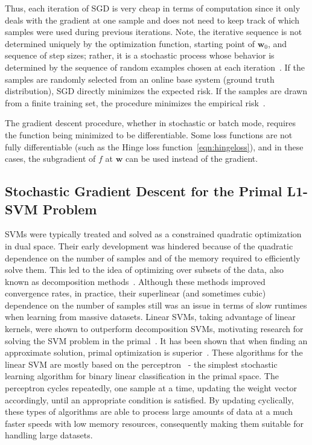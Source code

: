 \documentclass[reqno]{vcuthesis}
\numberwithin{equation}{chapter}
\begin{document}
Thus, each iteration of SGD is very cheap in terms of computation since it only deals with the gradient at one sample and does not need to keep track of which samples were used during previous iterations. Note, the iterative sequence is not determined uniquely by the optimization function, starting point of $\bm w_0$, and sequence of step sizes; rather, it is a stochastic process whose behavior is determined by the sequence of random examples chosen at each iteration~\cite{bottou2010large,bottou2018optimization}. If the samples are randomly selected from an online base system (ground truth distribution), SGD directly minimizes the expected risk. If the samples are drawn from a finite training set, the procedure minimizes the empirical risk~\cite{bottou2002stochastic}.

The gradient descent procedure, whether in stochastic or batch mode, requires the function being minimized to be differentiable. Some loss functions are not fully differentiable (such as the Hinge loss function~\ref{eqn:hingeloss}), and in these cases, the subgradient of $f$ at $\bm{w}$ can be used instead of the gradient. 

\subsection{Stochastic Gradient Descent for the Primal L1-SVM Problem}
SVMs were typically treated and solved as a constrained quadratic optimization in dual space. Their early development was hindered because of the quadratic dependence on the number of samples and of the memory required to efficiently solve them. This led to the idea of optimizing over subsets of the data, also known as decomposition methods~\cite{boser1992training,Joachims1999,keerthi2001improvements,Platt1998}. Although these methods improved convergence rates, in practice, their superlinear (and sometimes cubic) dependence on the number of samples still was an issue in terms of slow runtimes when learning from massive datasets. Linear SVMs, taking advantage of linear kernels, were shown to outperform decomposition SVMs, motivating research for solving the SVM problem in the primal~\cite{Chapelle2007,panagiotakopoulos2013stochastic}. It has been shown that when finding an approximate solution, primal optimization is superior~\cite{Chapelle2007}. These algorithms for the linear SVM are mostly based on the perceptron~\cite{freund1999large,rosenblatt1958perceptron} - the simplest stochastic learning algorithm for binary linear classification in the primal space. The perceptron cycles repeatedly, one sample at a time, updating the weight vector accordingly, until an appropriate condition is satisfied. By updating cyclically, these types of algorithms are able to process large amounts of data at a much faster speeds with low memory resources, consequently making them suitable for handling large datasets. 
\end{document}
